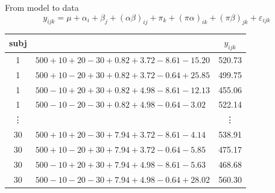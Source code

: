 \documentclass[aspectratio=169]{beamer}
\begin{document}
\begin{frame}{From model to data}
      \[
        y_{ijk} = \mu + \alpha_i + \beta_j + (\alpha\beta)_{ij} + \pi_k +
        (\pi\alpha)_{ik} + (\pi\beta)_{jk} + \varepsilon_{ijk}
      \]

\centering
  \begin{tabular}{c|l|c}
    \hline
    subj &  & $y_{ijk}$ \\
    \hline
    1 & $500 + 10 + 20 - 30 + 0.82 + 3.72 - 8.61 - 15.20$ & 520.73\\
    1 & $500 + 10 - 20 + 30 + 0.82 + 3.72 - 0.64 + 25.85$ & 499.75\\
    1 & $500 - 10 + 20 + 30 + 0.82 + 4.98 - 8.61 - 12.13$ & 455.06\\
    1 & $500 - 10 - 20 - 30 + 0.82 + 4.98 - 0.64 - 3.02$  & 522.14\\
    \vdots &  & \vdots\\
    30 & $500 + 10 + 20 - 30 + 7.94 + 3.72 - 8.61 - 4.14$  & 538.91\\
    30 & $500 + 10 - 20 + 30 + 7.94 + 3.72 - 0.64 - 5.85$  & 475.17\\
    30 & $500 - 10 + 20 + 30 + 7.94 + 4.98 - 8.61 - 5.63$  & 468.68\\
    30 & $500 - 10 - 20 - 30 + 7.94 + 4.98 - 0.64 + 28.02$ & 560.30\\
    \hline
  \end{tabular}
  \vfill
\end{frame}
\end{document}
